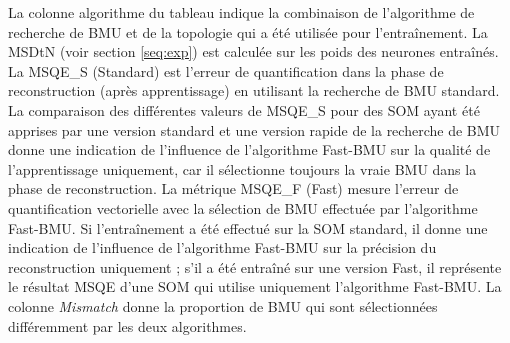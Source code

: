	La colonne algorithme du tableau indique la combinaison de l'algorithme de recherche de BMU et de la topologie qui a été utilisée pour l'entraînement. La MSDtN (voir section \ref{seq:exp}) est calculée sur les poids des neurones entraînés. La MSQE\_S (Standard) est l'erreur de quantification dans la phase de reconstruction (après apprentissage) en utilisant la recherche de BMU standard. La comparaison des différentes valeurs de MSQE\_S pour des SOM ayant été apprises par une version standard et une version rapide de la recherche de BMU donne une indication de l'influence de l'algorithme Fast-BMU sur la qualité de l'apprentissage uniquement, car il sélectionne toujours la vraie BMU dans la phase de reconstruction. La métrique MSQE\_F (Fast) mesure l'erreur de quantification vectorielle avec la sélection de BMU effectuée par l'algorithme Fast-BMU. Si l'entraînement a été effectué sur la SOM standard, il donne une indication de l'influence de l'algorithme Fast-BMU sur la précision du reconstruction uniquement ; s'il a été entraîné sur une version Fast, il représente le résultat MSQE d'une SOM qui utilise uniquement l'algorithme Fast-BMU. La colonne \textit{Mismatch} donne la proportion de BMU qui sont sélectionnées différemment par les deux algorithmes.

